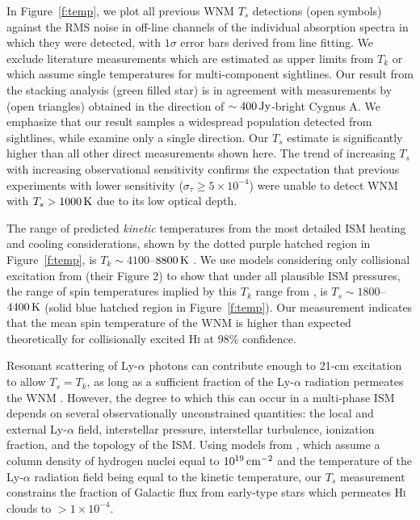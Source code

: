 \documentclass{aastex}
\begin{document}
In Figure~\ref{f:temp}, we plot all previous WNM $T_s$ detections 
(open symbols) against the RMS noise in off-line channels of the 
individual absorption spectra in which they were detected, with 
$1\sigma$ error bars derived from line fitting.  We exclude 
literature measurements which are estimated as upper limits 
from $T_k$ or which assume single temperatures for  
multi-component sightlines.  Our result from the stacking 
analysis (green filled star) is in agreement with 
measurements by \citet{CDG98} (open triangles) obtained in the 
direction of $\sim 400\rm\,Jy$-bright Cygnus A.  We emphasize 
that our result samples a widespread population detected 
from \NoOfKeeps{} sightlines,  while \citet{CDG98} examine 
only a single direction. Our $T_s$ estimate is significantly 
higher than all other direct measurements shown here. The 
trend of increasing $T_s$ with increasing observational 
sensitivity confirms the expectation that previous experiments 
with lower sensitivity ($\sigma_{\tau}\geq5\times10^{-4}$)
were unable to detect WNM with $T_s>1000\rm\,K$ due to its 
low optical depth.

The range of predicted \emph{kinetic} temperatures from the 
most detailed ISM heating and cooling considerations, shown by
the dotted purple hatched region in Figure~\ref{f:temp}, 
is $T_k\sim 4100$--$8800\rm\,K$ \citep{Wolfire03}. 
We use models considering 
only collisional excitation from \citet{Liszt01} (their Figure 2) to show that
under all plausible ISM pressures, 
the range of spin temperatures implied by this $T_k$
range from \citet{Wolfire03}, is $T_s\sim 1800$--$4400\rm\,K$ (solid blue hatched 
region in Figure~\ref{f:temp}).
Our measurement indicates that the mean spin 
temperature of the WNM is higher than expected theoretically 
for collisionally excited H\textsc{i} at 98\% confidence.  

Resonant scattering of Ly-$\alpha$ photons can contribute enough
to 21-cm excitation to allow  $T_s=T_k$, as long as a sufficient
fraction of the Ly-$\alpha$ radiation permeates the WNM 
\citep{Liszt01,Pritchard12}.  However, the degree to which 
this can occur in a multi-phase ISM depends on several 
observationally unconstrained quantities: the local and 
external Ly-$\alpha$ field, interstellar pressure, interstellar 
turbulence, ionization fraction, and the topology of the ISM. 
Using models from \citet{Liszt01}, which assume a column 
density of hydrogen nuclei equal to $10^{19}\rm\,cm^{-2}$ and 
the temperature of the Ly-$\alpha$ radiation field being 
equal to the kinetic temperature, our $T_s$ measurement 
constrains the fraction of Galactic flux from early-type 
stars which permeates H\textsc{i} clouds to $> 1\times 10^{-4}$.
\end{document}
